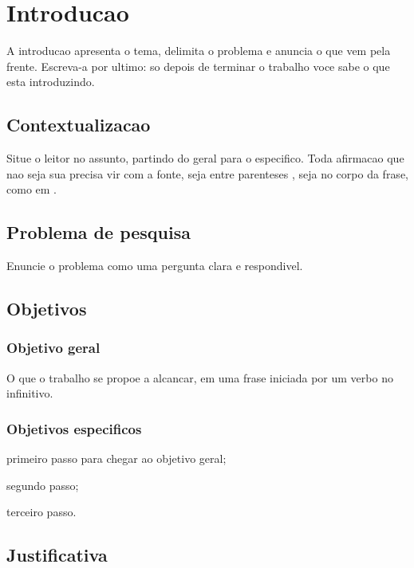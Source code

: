 \chapter{Introducao}
\label{cap:introducao}

A introducao apresenta o tema, delimita o problema e anuncia o que vem pela
frente. Escreva-a por ultimo: so depois de terminar o trabalho voce sabe o que
esta introduzindo.

\section{Contextualizacao}
\label{sec:contextualizacao}

Situe o leitor no assunto, partindo do geral para o especifico. Toda afirmacao
que nao seja sua precisa vir com a fonte, seja entre parenteses \cite{nbr14724},
seja no corpo da frase, como em .

\section{Problema de pesquisa}
\label{sec:problema}

Enuncie o problema como uma pergunta clara e respondivel.

\section{Objetivos}
\label{sec:objetivos}

\subsection{Objetivo geral}

O que o trabalho se propoe a alcancar, em uma frase iniciada por um verbo no
infinitivo.

\subsection{Objetivos especificos}

\begin{alineas}
  \item primeiro passo para chegar ao objetivo geral;
  \item segundo passo;
  \item terceiro passo.
\end{alineas}

\section{Justificativa}
\label{sec:justificativa}

